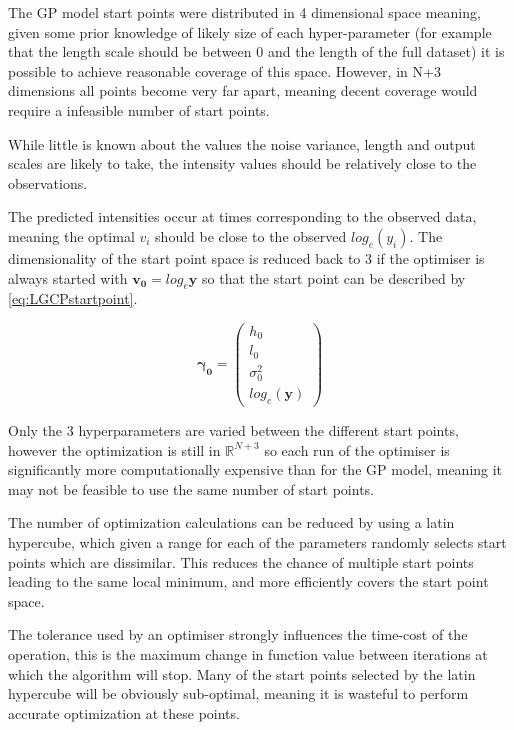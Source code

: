 \documentclass[a4paper,11pt]{report}
\begin{document}
The GP model start points were distributed in 4 dimensional space meaning, given some prior knowledge of likely size of each hyper-parameter (for example that the length scale should be between 0 and the length of the full dataset) it is possible to achieve reasonable coverage of this space. However, in N+3 dimensions all points become very far apart, meaning decent coverage would require a infeasible number of start points.

While little is known about the values the noise variance, length and output scales are likely to take, the intensity values should be relatively close to the observations. 

The predicted intensities occur at times corresponding to the observed data, meaning the optimal \(v_i\) should be close to the observed \(log_e(y_i)\). The dimensionality of the start point space is reduced back to 3 if the optimiser is always started with \(\mathbf{v_0} = log_e \mathbf{y}\) so that the start point can be described by \ref{eq:LGCPstartpoint}. 


\begin{equation} \label{eq:LGCPstartpoint}
\boldsymbol{\gamma_0} = \left( \begin{array}{cc}
h_0 \\
l_0 \\
\sigma^2_0 \\
log_e(\mathbf{y}) \end{array} \right) 
\end{equation}

Only the 3 hyperparameters are varied between the different start points, however the optimization is still in \(\mathds{R}^{N+3}\) so each run of the optimiser is significantly more computationally expensive than for the GP model, meaning it may not be feasible to use the same number of start points.  \par

The number of optimization calculations can be reduced by using a latin hypercube, which given a range for each of the parameters randomly selects start points which are dissimilar. \cite{latin-hyper} This reduces the chance of multiple start points leading to the same local minimum, and more efficiently covers the start point space. \par

The tolerance used by an optimiser strongly influences the time-cost of the operation, this is the maximum change in function value between iterations at which the algorithm will stop. Many of the start points selected by the latin hypercube will be obviously sub-optimal, meaning it is wasteful to perform accurate optimization at these points. \par
\end{document}
